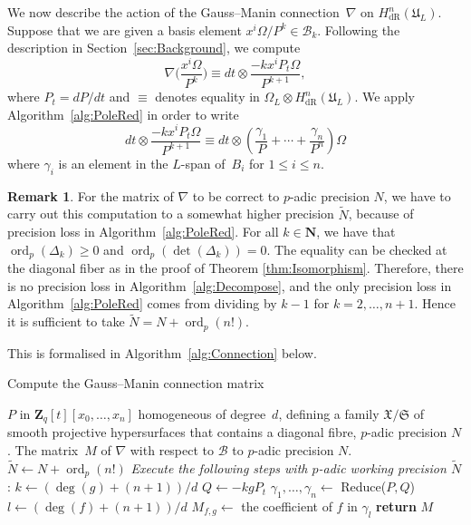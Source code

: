 \documentclass[a4paper,11pt]{article}
\numberwithin{equation}{section}
\newcommand{\NN}{\mathbf{N}} %
\newcommand{\ZZ}{\mathbf{Z}} %
\DeclareMathOperator{\ord}{ord}          %
\providecommand{\HdR}{H_{\text{dR}}}    %
\providecommand{\cB}{\mathcal{B}} %
\theoremstyle{definition}
\newtheorem{rem}[thm]{Remark}
\begin{document}
We now describe the action of the Gauss--Manin connection~$\nabla$ on 
$\HdR^n(\mathfrak{U}_L)$.  Suppose that we are given a basis element 
$x^i \Omega / P^k \in \cB_k$.  Following the description in 
Section~\ref{sec:Background}, we compute
\begin{equation} \label{eqn:nabla}
\nabla \biggl(\frac{x^i \Omega}{P^k}\biggr) \equiv 
dt \otimes \frac{- k x^i P_t \Omega}{P^{k+1}},
\end{equation}
where $P_t = dP/dt$ and $\equiv$ denotes equality in 
$\Omega_{L} \otimes \HdR^n(\mathfrak{U}_L)$. We apply 
Algorithm~\ref{alg:PoleRed} in order to write
\begin{equation}
dt \otimes \frac{- k x^i P_t \Omega}{P^{k+1}} \equiv 
dt \otimes \left( \frac{\gamma_{1}}{P} + \dotsb + \frac{\gamma_n}{P^n} \right) \Omega
\end{equation}
where $\gamma_i$ is an element in the $L$-span of~$B_i$ for $1 \leq i \leq n$. 

\begin{rem}
For the matrix of $\nabla$ to be correct to $p$-adic precision $N$, we have to 
carry out this computation to a somewhat higher precision $\tilde{N}$, because of 
precision loss in Algorithm~\ref{alg:PoleRed}. 
For all $k \in \NN$, we have that $\ord_p(\Delta_k) \geq 0$ and $\ord_p(\det(\Delta_k))=0$. 
The equality can be checked at the diagonal fiber as in the proof of 
Theorem \ref{thm:Isomorphism}. Therefore, there is no precision loss 
in Algorithm~\ref{alg:Decompose}, and the only precision loss in Algorithm~\ref{alg:PoleRed} 
comes from dividing by $k-1$ for $k=2,\ldots,n+1$. Hence it is sufficient to take 
$\tilde{N}=N + \ord_p(n!)$.
\end{rem}

This is formalised in Algorithm~\ref{alg:Connection} below.

\begin{algorithm}
\caption{Compute the Gauss--Manin connection matrix}
\label{alg:Connection}
\begin{algorithmic}
\Require $P$ in $\ZZ_q[t][x_0, \dotsc, x_n]$ homogeneous of degree~$d$, 
         defining a family $\mathfrak{X}/\mathfrak{S}$ of smooth projective 
         hypersurfaces that contains a diagonal fibre, $p$-adic precision $N$.
\Ensure  The matrix~$M$ of $\nabla$ with respect to $\cB$ to $p$-adic precision $N$.
\State $\tilde{N} \gets N + \ord_p(n!)$
\State \textit{Execute the following steps with $p$-adic working precision $\tilde{N}$}:
\State $k \gets  (\deg(g)+(n+1))/d$
\State $Q \gets  - k g P_t$ 
\State $\gamma_{1}, \dotsc, \gamma_n \gets$
      {\sc Reduce($P,Q$)} 
\State $l \gets (\deg(f)+(n+1))/d$
\State $M_{f,g} \gets$ the coefficient of $f$ in $\gamma_l$
\EndFor
\EndFor
\textbf{return} $M$
\EndProcedure
\end{algorithmic}
\end{algorithm}
\end{document}
